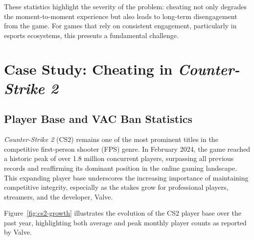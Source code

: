 These statistics highlight the severity of the problem: cheating not only degrades the moment-to-moment experience but also leads to long-term disengagement from the game. For games that rely on consistent engagement, particularly in esports ecosystems, this presents a fundamental challenge.
\section{Case Study: Cheating in \textit{Counter-Strike 2}}


\subsection{Player Base and VAC Ban Statistics}

\textit{Counter-Strike 2} (CS2) remains one of the most prominent titles in the competitive first-person shooter (FPS) genre. In February 2024, the game reached a historic peak of over 1.8 million concurrent players, surpassing all previous records and reaffirming its dominant position in the online gaming landscape. This expanding player base underscores the increasing importance of maintaining competitive integrity, especially as the stakes grow for professional players, streamers, and the developer, Valve.

Figure~\ref{fig:cs2-growth} illustrates the evolution of the CS2 player base over the past year, highlighting both average and peak monthly player counts as reported by Valve.

